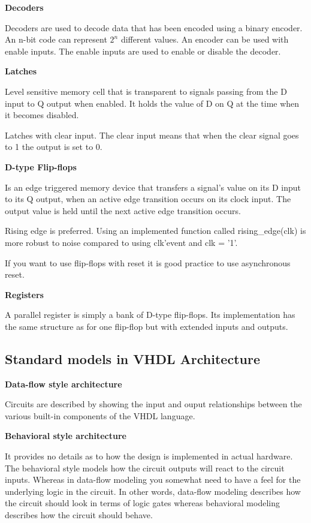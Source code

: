 \textbf{Decoders}

Decoders are used to decode data that has been encoded using a binary encoder.
An n-bit code can represent $2^n$ different values.
An encoder can be used with enable inputs. The enable inputs are used to enable or disable the decoder.


\textbf{Latches}

Level sensitive memory cell that is transparent to signals passing from
the D input to Q output when enabled. It holds the value of D on Q at the
time when it becomes disabled.

Latches with clear input. The clear input means that when the clear signal
goes to 1 the output is set to 0.


\textbf{D-type Flip-flops}

Is an edge triggered memory device that transfers a signal's value on its
D input to its Q output, when an active edge transition occurs on its clock input.
The output value is held until the next active edge transition occurs.

Rising edge is preferred. Using an implemented function called rising\_edge(clk)
is more robust to noise compared to using clk'event and clk = '1'.

If you want to use flip-flops with reset it is good practice to use asynchronous reset.

\textbf{Registers}

A parallel register is simply a bank of D-type flip-flops. Its implementation
has the same structure as for one flip-flop but with extended inputs and outputs.



\newpage
\subsection{Standard models in VHDL Architecture}


\textbf{Data-flow style architecture}

Circuits are described by showing the input and ouput relationships between the various built-in components of the VHDL language.

\textbf{Behavioral style architecture}

It provides no details as to how the design is implemented in actual hardware.
The behavioral style models how the circuit outputs will react to the circuit inputs.
Whereas in data-flow modeling you somewhat need to have a feel for the underlying logic in the circuit.
In other words, data-flow modeling describes how the circuit should look in terms of logic gates
whereas behavioral modeling describes how the circuit should behave.
